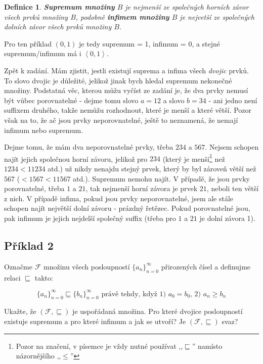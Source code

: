 \documentclass{article}
\newtheorem{definice}{Definice}[section]
\begin{document}
\begin{definice}
\textbf{Supremum množiny} $B$ je nejmenší ze společných horních závor všech prvků množiny $B$, podobně \textbf{infimem množiny} $B$ je nejvetší ze společných dolních závor všech prvků množiny $B$. 
\end{definice}

Pro ten příklad $\left(0,1\right)$ je tedy supremum = 1, infimum = 0, a stejné supremum/infimum má i $\left<0,1\right>$.

Zpět k zadání. Mám zjistit, jestli existují suprema a infima všech \emph{dvojic} prvků. To slovo dvojic je důležité, jelikož jinak bych hledal supremum nekonečné množiny. Podstatná věc, kterou můžu vyčíst ze zadání je, že dva prvky nemusí být vůbec porovnatelné - dejme tomu slovo $a = 12$ a slovo $b = 34$ - ani jedno není suffixem druhého, takže nemůžu rozhodnout, které je menší a které větší. Pozor však na to, že ač jsou prvky neporovnatelné, ještě to neznamená, že nemají infimum nebo supremum. 

Dejme tomu, že mám dva neporovnatelné prvky, třeba \(234\) a \(567\). Nejsem schopen najít jejich společnou horní závoru, jelikož pro $234$ (který je menší\footnote{Pozor na značení, v písemce je vždy nutné používat ,,\(\sqsubseteq\)'' namísto názornějšího ,,\(\leq\)''} než \(1234 < 11234\) atd.) už nikdy nenajdu stejný prvek, který by byl zároveň větší než $567$ ($< 1567 < 11567$ atd.). Supremum nemohu najít. V případě, že jsou prvky porovnatelné, třeba $1$ a $21$, tak nejmenší horní závora je prvek $21$, neboli ten větší z nich. V případě infima, pokud jsou prvky neporovnatelné, jsem ale stále schopen najít největší dolní závoru - prázdný řetězec. Pokud porovnatelné jsou, pak infimum je jejich nejdelší společný suffix (třeba pro $1$ a $21$ je dolní závora 1).  

\subsection{Příklad 2}
Označme $\mathcal{F}$ množinu všech posloupností $\{a_n\}^{\infty}_{n=0}$ přirozených čísel a definujme relaci $\sqsubseteq$ takto:

\[ \{a_n\}^{\infty}_{n=0} \sqsubseteq \{b_n\}^{\infty}_{n=0} \text{ právě tehdy, když 1) } a_0 = b_0 \text {, 2) } a_n \geq b_n \]

Ukažte, že $(\mathcal{F},\sqsubseteq)$ je uspořádaná množina. Pro které dvojice posloupností existuje supremum a pro které infimum a jak se utvoří? Je $(\mathcal{F},\sqsubseteq)$ svaz? 
 
\end{document}
